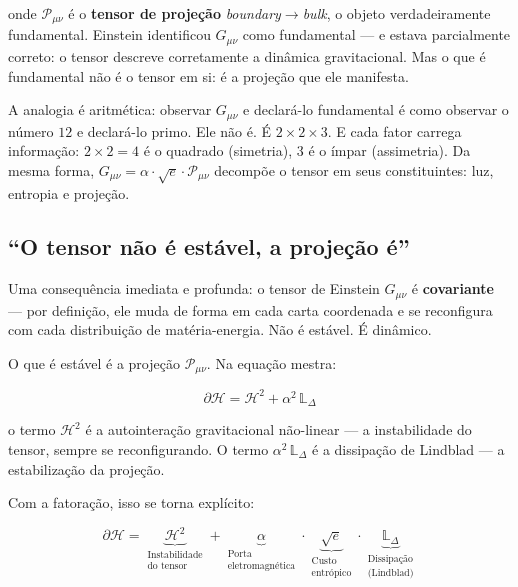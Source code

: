 \documentclass[12pt,a4paper,twoside]{article}
\newcommand{\alphaii}{\alpha^{2}}
\newcommand{\boundary}{\textit{boundary}}
\newcommand{\bulk}{\textit{bulk}}
\begin{document}
\noindent onde $\mathcal{P}_{\mu\nu}$ é o \textbf{tensor de projeção} \boundary$\to$\bulk, o objeto verdadeiramente fundamental. Einstein identificou $G_{\mu\nu}$ como fundamental --- e estava parcialmente correto: o tensor descreve corretamente a dinâmica gravitacional. Mas o que é fundamental não é o tensor em si: é a projeção que ele manifesta.

A analogia é aritmética: observar $G_{\mu\nu}$ e declará-lo fundamental é como observar o número $12$ e declará-lo primo. Ele não é. É $2 \times 2 \times 3$. E cada fator carrega informação: $2 \times 2 = 4$ é o quadrado (simetria), $3$ é o ímpar (assimetria). Da mesma forma, $G_{\mu\nu} = \alpha \cdot \sqrt{e} \cdot \mathcal{P}_{\mu\nu}$ decompõe o tensor em seus constituintes: luz, entropia e projeção.

\subsection{``O tensor não é estável, a projeção é''}

Uma consequência imediata e profunda: o tensor de Einstein $G_{\mu\nu}$ é \textbf{covariante} --- por definição, ele muda de forma em cada carta coordenada e se reconfigura com cada distribuição de matéria-energia. Não é estável. É dinâmico.

O que é estável é a projeção $\mathcal{P}_{\mu\nu}$. Na equação mestra:

\begin{equation}
\partial\mathcal{H} = \mathcal{H}^2 + \alphaii\,\mathbb{L}_\Delta
\end{equation}

\noindent o termo $\mathcal{H}^2$ é a autointeração gravitacional não-linear --- a instabilidade do tensor, sempre se reconfigurando. O termo $\alphaii\,\mathbb{L}_\Delta$ é a dissipação de Lindblad --- a estabilização da projeção.

Com a fatoração, isso se torna explícito:

\begin{equation}
\partial\mathcal{H} = \underbrace{\mathcal{H}^2}_{\substack{\text{Instabilidade}\\\text{do tensor}}} + \underbrace{\alpha}_{\substack{\text{Porta}\\\text{eletromagnética}}} \cdot \underbrace{\sqrt{e}}_{\substack{\text{Custo}\\\text{entrópico}}} \cdot \underbrace{\mathbb{L}_\Delta}_{\substack{\text{Dissipação}\\\text{(Lindblad)}}}
\label{eq:mestra_decomposta}
\end{equation}
\end{document}
